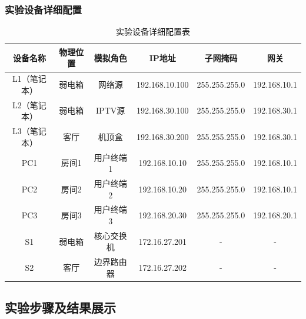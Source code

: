 \documentclass[a4paper]{article}
\begin{document}
\subsubsection{实验设备详细配置}
\begin{table}[H]
\centering

\begin{tabular}{|c|c|c|c|c|c|}
\hline
\textbf{设备名称} & \textbf{物理位置} & \textbf{模拟角色} & \textbf{IP地址} & \textbf{子网掩码} & \textbf{网关} \\
\hline
L1（笔记本） & 弱电箱 & 网络源 & 192.168.10.100 & 255.255.255.0 & 192.168.10.1 \\
\hline
L2（笔记本） & 弱电箱 & IPTV源 & 192.168.30.100 & 255.255.255.0 & 192.168.30.1 \\
\hline
L3（笔记本） & 客厅 & 机顶盒 & 192.168.30.200 & 255.255.255.0 & 192.168.30.1 \\
\hline
PC1 & 房间1 & 用户终端1 & 192.168.10.10 & 255.255.255.0 & 192.168.10.1 \\
\hline
PC2 & 房间2 & 用户终端2 & 192.168.10.20 & 255.255.255.0 & 192.168.10.1 \\
\hline
PC3 & 房间3 & 用户终端3 & 192.168.20.30 & 255.255.255.0 & 192.168.20.1 \\
\hline
S1 & 弱电箱 & 核心交换机 & 172.16.27.201 & - & - \\
\hline
S2 & 客厅 & 边界路由器 & 172.16.27.202 & - & - \\
\hline
\end{tabular}
\caption{实验设备详细配置表}
\end{table}

\subsection{实验步骤及结果展示}
\end{document}

